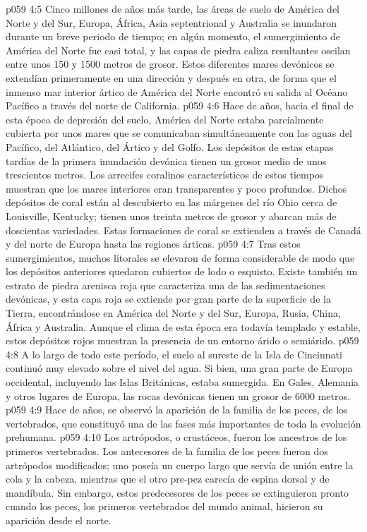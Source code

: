 \vs p059 4:5 Cinco millones de años más tarde, las áreas de suelo de América del Norte y del Sur, Europa, África, Asia septentrional y Australia se inundaron durante un breve periodo de tiempo; en algún momento, el sumergimiento de América del Norte fue casi total, y las capas de piedra caliza resultantes oscilan entre unos 150 y 1500 metros de grosor. Estos diferentes mares devónicos se extendían primeramente en una dirección y después en otra, de forma que el inmenso mar interior ártico de América del Norte encontró su salida al Océano Pacífico a través del norte de California.
\vs p059 4:6 \pc Hace  de años, hacia el final de esta época de depresión del suelo, América del Norte estaba parcialmente cubierta por unos mares que se comunicaban simultáneamente con las aguas del Pacífico, del Atlántico, del Ártico y del Golfo. Los depósitos de estas etapas tardías de la primera inundación devónica tienen un grosor medio de unos trescientos metros. Los arrecifes coralinos característicos de estos tiempos muestran que los mares interiores eran transparentes y poco profundos. Dichos depósitos de coral están al descubierto en las márgenes del río Ohio cerca de Louisville, Kentucky; tienen unos treinta metros de grosor y abarcan más de doscientas variedades. Estas formaciones de coral se extienden a través de Canadá y del norte de Europa hasta las regiones árticas.
\vs p059 4:7 Tras estos sumergimientos, muchos litorales se elevaron de forma considerable de modo que los depósitos anteriores quedaron cubiertos de lodo o esquisto. Existe también un estrato de piedra arenisca roja que caracteriza una de las sedimentaciones devónicas, y esta capa roja se extiende por gran parte de la superficie de la Tierra, encontrándose en América del Norte y del Sur, Europa, Rusia, China, África y Australia. Aunque el clima de esta época era todavía templado y estable, estos depósitos rojos muestran la presencia de un entorno árido o semiárido.
\vs p059 4:8 A lo largo de todo este período, el suelo al sureste de la Isla de Cincinnati continuó muy elevado sobre el nivel del agua. Si bien, una gran parte de Europa occidental, incluyendo las Islas Británicas, estaba sumergida. En Gales, Alemania y otros lugares de Europa, las rocas devónicas tienen un grosor de 6000 metros.
\vs p059 4:9 \pc Hace  de años, se observó la aparición de la familia de los peces, de los vertebrados, que constituyó una de las fases más importantes de toda la evolución prehumana.
\vs p059 4:10 Los artrópodos, o crustáceos, fueron los ancestros de los primeros vertebrados. Los antecesores de la familia de los peces fueron dos artrópodos modificados; uno poseía un cuerpo largo que servía de unión entre la cola y la cabeza, mientras que el otro pre\hyp{}pez carecía de espina dorsal y de mandíbula. Sin embargo, estos predecesores de los peces se extinguieron pronto cuando los peces, los primeros vertebrados del mundo animal, hicieron  su aparición desde el norte.
